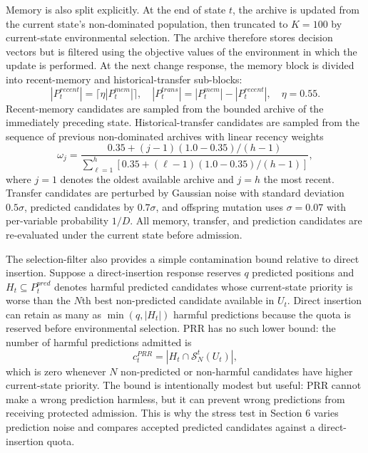 \documentclass[1p,times]{elsarticle}
\begin{document}
Memory is also split explicitly. At the end of state $t$, the archive is updated from the current state's non-dominated population, then truncated to $K=100$ by current-state environmental selection. The archive therefore stores decision vectors but is filtered using the objective values of the environment in which the update is performed. At the next change response, the memory block is divided into recent-memory and historical-transfer sub-blocks:
\begin{equation}
|P^{recent}_t|=\lceil \eta |P^{mem}_t|\rceil,\quad |P^{trans}_t|=|P^{mem}_t|-|P^{recent}_t|,\quad \eta=0.55.
\end{equation}
Recent-memory candidates are sampled from the bounded archive of the immediately preceding state. Historical-transfer candidates are sampled from the sequence of previous non-dominated archives with linear recency weights
\begin{equation}
\omega_j=\frac{0.35+(j-1)(1.0-0.35)/(h-1)}{\sum_{\ell=1}^{h}\left[0.35+(\ell-1)(1.0-0.35)/(h-1)\right]},
\end{equation}
where $j=1$ denotes the oldest available archive and $j=h$ the most recent. Transfer candidates are perturbed by Gaussian noise with standard deviation $0.5\sigma$, predicted candidates by $0.7\sigma$, and offspring mutation uses $\sigma=0.07$ with per-variable probability $1/D$. All memory, transfer, and prediction candidates are re-evaluated under the current state before admission.

The selection-filter also provides a simple contamination bound relative to direct insertion. Suppose a direct-insertion response reserves $q$ predicted positions and $H_t\subseteq P^{pred}_t$ denotes harmful predicted candidates whose current-state priority is worse than the $N$th best non-predicted candidate available in $U_t$. Direct insertion can retain as many as $\min(q,|H_t|)$ harmful predictions because the quota is reserved before environmental selection. PRR has no such lower bound: the number of harmful predictions admitted is
\begin{equation}
c^{PRR}_t=\left|H_t\cap \mathcal{S}^{t}_{N}(U_t)\right|,
\end{equation}
which is zero whenever $N$ non-predicted or non-harmful candidates have higher current-state priority. The bound is intentionally modest but useful: PRR cannot make a wrong prediction harmless, but it can prevent wrong predictions from receiving protected admission. This is why the stress test in Section 6 varies prediction noise and compares accepted predicted candidates against a direct-insertion quota.
\end{document}
